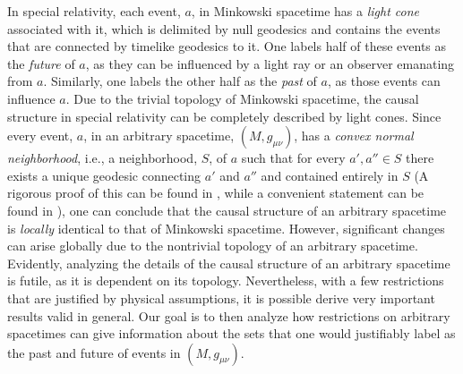 \documentclass[
12pt,		%
openright,	%
twoside,  %
a4paper,			%
chapter=TITLE,		%
english,			%
french,				%
spanish,			%
brazil				%
]{USPSC-classe/USPSC}
\begin{document}
In special relativity, each event, $a$, in Minkowski spacetime has a \textit{light cone} associated with it, which is delimited by null geodesics and contains the events that are connected by timelike geodesics to it. One labels half of these events as the \textit{future} of $a$, as they can be influenced by a light ray or an observer emanating from $a$. Similarly, one labels the other half as the \textit{past} of $a$, as those events can influence $a$. Due to the trivial topology of Minkowski spacetime, the causal structure in special relativity can be completely described by light cones. Since every event, $a$, in an arbitrary spacetime, $(M,g_{\mu\nu})$, has a \textit{convex normal neighborhood}, i.e., a neighborhood, $S$, of $a$ such that for every $a',a''\in S$ there exists a unique geodesic connecting $a'$ and $a''$ and contained entirely in $S$ (A rigorous proof of this can be found in \cite{Hawking1973}, while a convenient statement can be found in \cite{Wald1984}), one can conclude that the causal structure of an arbitrary spacetime is \textit{locally} identical to that of Minkowski spacetime. However, significant changes can arise globally due to the nontrivial topology of an arbitrary spacetime. Evidently, analyzing the details of the causal structure of an arbitrary spacetime is futile, as it is dependent on its topology. Nevertheless, with a few restrictions that are justified by physical assumptions, it is possible derive very important results valid in general. Our goal is to then analyze how restrictions on arbitrary spacetimes can give information about the sets that one would justifiably label as the past and future of events in $(M,g_{\mu\nu})$.
\end{document}
